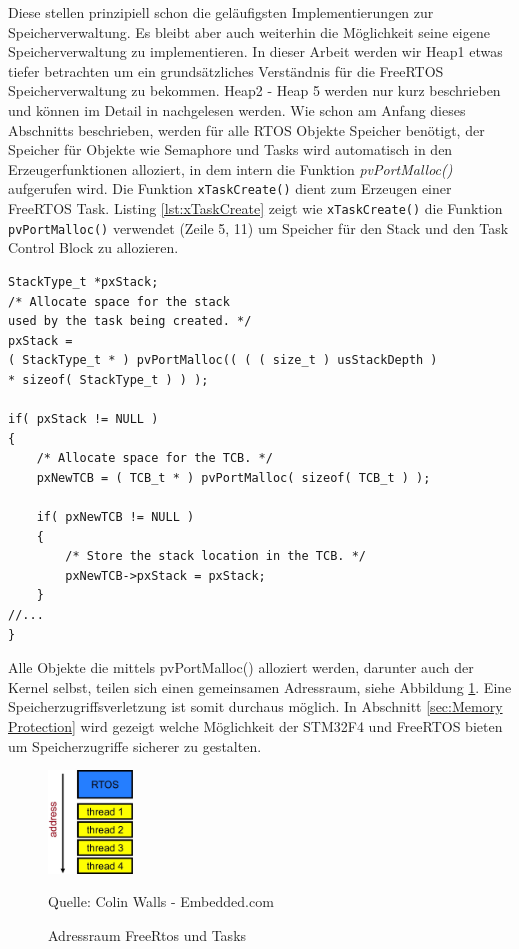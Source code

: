 \documentclass[ngerman]{seminarvorlage}
\newcommand*{\quelle}{%
  \footnotesize Quelle: 
}
\begin{document}
Diese stellen prinzipiell schon die geläufigsten Implementierungen zur Speicherverwaltung. Es bleibt aber auch weiterhin die Möglichkeit seine eigene Speicherverwaltung zu implementieren. In dieser Arbeit werden wir Heap1 etwas tiefer betrachten um ein grundsätzliches Verständnis für die FreeRTOS Speicherverwaltung zu bekommen. Heap2 - Heap 5 werden nur kurz beschrieben und können im Detail in \cite{MasteringFreeRtos}\cite{FreeRtosAdvanced} nachgelesen werden.      
Wie schon am Anfang dieses Abschnitts beschrieben, werden für alle RTOS Objekte Speicher benötigt, der Speicher für Objekte wie Semaphore und Tasks wird automatisch in den Erzeugerfunktionen alloziert, in dem intern die Funktion \textit{pvPortMalloc()} aufgerufen wird. Die Funktion \verb|xTaskCreate()| dient zum Erzeugen einer FreeRTOS Task. Listing \ref{lst:xTaskCreate} zeigt wie \verb|xTaskCreate()| die Funktion \verb|pvPortMalloc()| verwendet (Zeile 5, 11) um Speicher für den Stack und den Task Control Block zu allozieren.
\begin{lstlisting}[caption={xTaskCreate() memory allocation. Aus Task.c},captionpos=b, label=lst:xTaskCreate, float=hbt]
StackType_t *pxStack;
/* Allocate space for the stack 
used by the task being created. */
pxStack = 
( StackType_t * ) pvPortMalloc(( ( ( size_t ) usStackDepth ) 
* sizeof( StackType_t ) ) );

if( pxStack != NULL )
{
	/* Allocate space for the TCB. */
	pxNewTCB = ( TCB_t * ) pvPortMalloc( sizeof( TCB_t ) );

	if( pxNewTCB != NULL )
	{
		/* Store the stack location in the TCB. */
		pxNewTCB->pxStack = pxStack;
	}
//...
}

\end{lstlisting}
Alle Objekte die mittels pvPortMalloc() alloziert werden, darunter auch der Kernel selbst, teilen sich einen gemeinsamen Adressraum, siehe Abbildung \ref{fig:AddressSpace}. Eine Speicherzugriffsverletzung ist somit durchaus möglich. In Abschnitt \ref{sec:Memory Protection} wird gezeigt welche Möglichkeit der STM32F4 und FreeRTOS bieten um Speicherzugriffe sicherer zu gestalten.    
\begin{figure}[hb!]
	\centering
		\includegraphics[width=0.2\textwidth]{Pictures/EmbeddedCom/addressSpace.jpg}
	\caption{Adressraum FreeRtos und Tasks}
	\quelle{Colin Walls - Embedded.com}
	\label{fig:AddressSpace}
\end{figure}    
\end{document}
